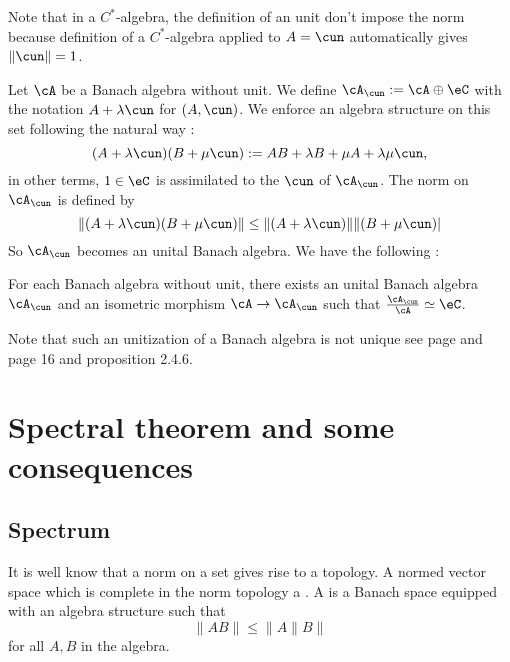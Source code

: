 Note that in a $C^*$-algebra, the definition of an unit don't impose the norm because definition of a $C^*$-algebra applied to $A=\cun$ automatically gives $\|\cun\|=1$.

Let $\cA$ be a Banach algebra without unit. We define $\cA_{\cun}:=\cA\oplus\eC$ with the notation $A+\lambda\cun$ for $(A,\cun)$. We enforce an algebra structure on this set following the natural way :
\[
  (A+\lambda\cun)(B+\mu\cun):=AB+\lambda B+\mu A+\lambda\mu\cun,
\]
in other terms, $1\in\eC$ is assimilated to the $\cun$ of $\cA_{\cun}$. The norm on $\cA_{\cun}$ is defined by
\[
   \|(A+\lambda\cun)(B+\mu\cun)\|\leq\|(A+\lambda\cun)\|\|(B+\mu\cun)|
\]
So $\cA_{\cun}$ becomes an unital Banach algebra. We have the following :

\begin{proposition}
For each Banach algebra without unit, there exists an unital Banach algebra $\cA_{\cun}$ and an isometric morphism $\cA\to\cA_{\cun}$ such that $\frac{\cA_{\cun}}{\cA}\simeq\eC$.
\end{proposition}

Note that such an unitization of a Banach algebra is not unique see page \pageref{pg:unit_nonunic} and \cite{Landsman} page 16 and proposition 2.4.6.

  
\section{Spectral theorem and some consequences}\label{pg_spectralthe}

\subsection{Spectrum}

It is well know that a norm on a set gives rise to a topology. A normed vector space which is complete in the norm topology a . A  is a Banach space equipped with an algebra structure such that 
\begin{equation} \label{eq:normBanach}
  \|AB\|\leq\|A\|B\|
\end{equation}
for all $A,B$ in the algebra. \label{def_banach}

